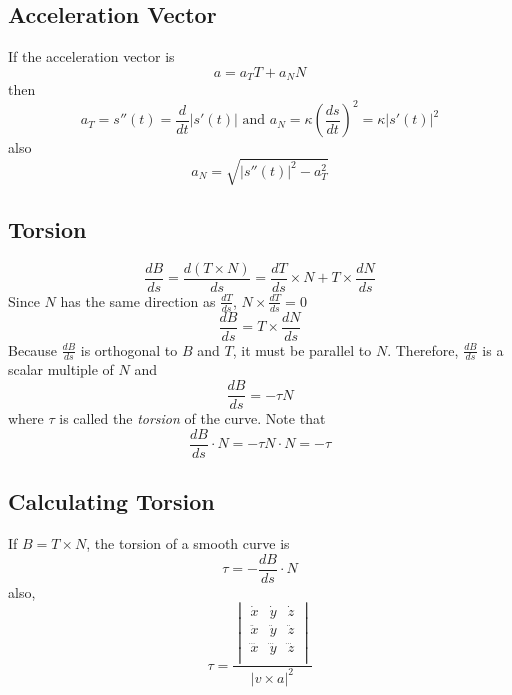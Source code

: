 \documentclass[../main.tex]{subfiles}
\begin{document}
\subsection{Acceleration Vector}
If the acceleration vector is 
\begin{equation*}
a = a_T T + a_N N
\end{equation*}
then 
\begin{equation*}
a_T = s''(t) = \frac{d}{dt} |s'(t)| \text{ and } a_N = \kappa \left( \frac{ds}{dt} \right)^2 = \kappa |s'(t)|^2
\end{equation*}
also
\begin{equation*}
a_N = \sqrt{|s''(t)|^2 - a_T^2}
\end{equation*}

\subsection{Torsion}
\begin{equation*}
\frac{dB}{ds} = \frac{d(T \times N)}{ds} = \frac{dT}{ds} \times N + T \times \frac{dN}{ds}
\end{equation*}
Since $N$ has the same direction as $\frac{dT}{ds}$, $N \times \frac{dT}{ds} = 0$
\begin{equation*}
\frac{dB}{ds} = T \times \frac{dN}{ds}
\end{equation*}
Because $\frac{dB}{ds}$ is orthogonal to $B$ and $T$, it must be parallel to $N$. Therefore, 
$\frac{dB}{ds}$ is a scalar multiple of $N$ and 
\begin{equation*}
\frac{dB}{ds} = -\tau N
\end{equation*}
where $\tau$ is called the \textit{torsion} of the curve. Note that 
\begin{equation*}
\frac{dB}{ds} \cdot N = -\tau N \cdot N = -\tau
\end{equation*}

\subsection{Calculating Torsion}
If $B = T \times N$, the torsion of a smooth curve is 
\begin{equation*}
\tau = - \frac{dB}{ds} \cdot N
\end{equation*}
also, 
\begin{equation*}
\tau = \frac{
	\begin{vmatrix}
	\dot x & \dot y & \dot z \\
	\ddot x & \ddot y & \ddot z \\
	\dddot x & \dddot y & \dddot z \\
	\end{vmatrix}
}{| v \times a |^2}
\end{equation*}
\end{document}
